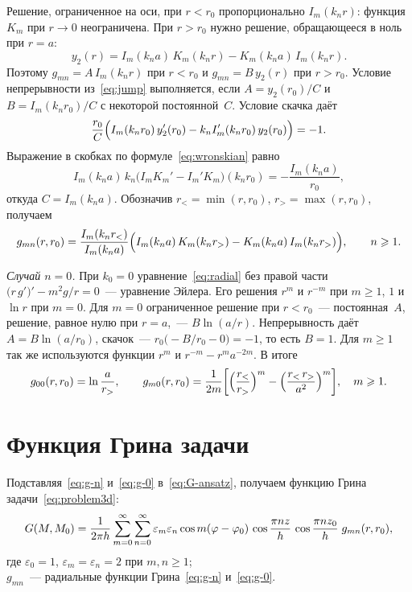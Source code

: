Решение, ограниченное на оси, при $r<r_0$ пропорционально $I_m(k_n r)$:
функция $K_m$ при $r\to0$ неограничена. При $r>r_0$ нужно решение,
обращающееся в ноль при $r=a$:
\[
y_2(r)=I_m(k_n a)\,K_m(k_n r)-K_m(k_n a)\,I_m(k_n r) .
\]
Поэтому $g_{mn}=A\,I_m(k_n r)$ при $r<r_0$ и $g_{mn}=B\,y_2(r)$ при $r>r_0$.
Условие непрерывности из~\eqref{eq:jump} выполняется, если
$A=y_2(r_0)/C$ и $B=I_m(k_n r_0)/C$ с некоторой постоянной~$C$. Условие
скачка даёт
\[
\frac{r_0}{C}\Bigl(I_m(k_n r_0)\,y_2'(r_0)
-k_n I_m'(k_n r_0)\,y_2(r_0)\Bigr)=-1 .
\]
Выражение в скобках по формуле~\eqref{eq:wronskian} равно
\[
I_m(k_n a)\,k_n\bigl(I_mK_m'-I_m'K_m\bigr)(k_n r_0)=-\frac{I_m(k_n a)}{r_0},
\]
откуда $C=I_m(k_n a)$. Обозначив $r_<=\min(r,r_0)$, $r_>=\max(r,r_0)$,
получаем
\begin{equation}
\label{eq:g-n}
g_{mn}(r,r_0)=\frac{I_m(k_n r_<)}{I_m(k_n a)}
\Bigl(I_m(k_n a)\,K_m(k_n r_>)-K_m(k_n a)\,I_m(k_n r_>)\Bigr),
\qquad n\ge1 .
\end{equation}

\emph{Случай $n=0$.} При $k_0=0$ уравнение~\eqref{eq:radial} без правой
части $\bigl(r\,g'\bigr)'-m^2g/r=0$~— уравнение Эйлера. Его решения $r^m$
и $r^{-m}$ при $m\ge1$, $1$ и $\ln r$ при $m=0$. Для $m=0$ ограниченное
решение при $r<r_0$~— постоянная~$A$, решение, равное нулю при $r=a$,~—
$B\ln(a/r)$. Непрерывность даёт $A=B\ln(a/r_0)$, скачок~—
$r_0\bigl(-B/r_0-0\bigr)=-1$, то есть $B=1$. Для $m\ge1$ так же
используются функции $r^m$ и $r^{-m}-r^m a^{-2m}$. В итоге
\begin{equation}
\label{eq:g-0}
g_{00}(r,r_0)=\ln\frac{a}{r_>},\qquad
g_{m0}(r,r_0)=\frac{1}{2m}\biggl[\Bigl(\frac{r_<}{r_>}\Bigr)^{m}
-\Bigl(\frac{r_<\,r_>}{a^2}\Bigr)^{m}\biggr],\quad m\ge1 .
\end{equation}

\section{Функция Грина задачи}
\label{sec:G-final}

Подставляя~\eqref{eq:g-n} и~\eqref{eq:g-0} в~\eqref{eq:G-ansatz},
получаем функцию Грина задачи~\eqref{eq:problem3d}:
\begin{equation}
\label{eq:G}
G(M,M_0)=\frac{1}{2\pi h}\sum_{m=0}^{\infty}\sum_{n=0}^{\infty}
\varepsilon_m\varepsilon_n\cos m(\varphi-\varphi_0)\,
\cos\frac{\pi nz}{h}\,\cos\frac{\pi nz_0}{h}\;g_{mn}(r,r_0),
\postdisplaypenalty=10000
\end{equation}
где $\varepsilon_0=1$, $\varepsilon_m=\varepsilon_n=2$ при $m,n\ge1$;\\
\hphantom{где }$g_{mn}$~— радиальные функции Грина~\eqref{eq:g-n}
и~\eqref{eq:g-0}.

